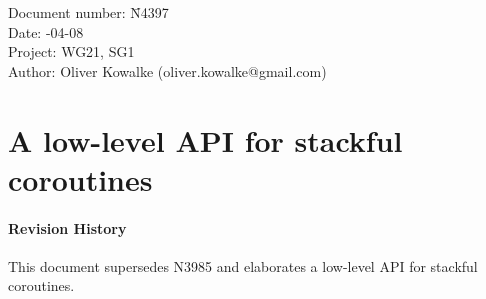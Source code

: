 \documentclass[paper=A4,pagesize,DIV=15]{scrartcl}
\begin{document}
\small
\begin{tabbing}
    Document number: \= N4397\\
    Date:            -04-08\\
    Project:         \> WG21, SG1\\
    Author:          \> Oliver Kowalke (oliver.kowalke@gmail.com)\\
\end{tabbing}

\section*{A low-level API for stackful coroutines}


\tableofcontents


\paragraph*{Revision History}
This document supersedes N3985 and elaborates a low-level API for stackful
coroutines.















\end{document}
